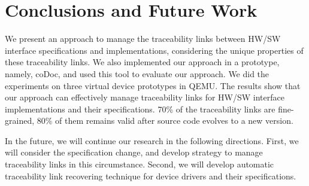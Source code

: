 \section{Conclusions and Future Work}
\label{sec:conclusion}
We present an approach to manage the traceability links between HW/SW interface specifications and implementations, considering the unique properties of these traceability links. We also implemented our approach in a prototype, namely, coDoc, and used this tool to evaluate our approach. We did the experiments on three virtual device prototypes in QEMU. The results show that our approach can effectively manage traceability links for HW/SW interface implementations and their specifications. 70\% of the traceability links are fine-grained, 80\% of them remains valid after source code evolves to a new version.

In the future, we will continue our research in the following directions. First, we will consider the specification change, and develop strategy to manage traceability links in this circumstance. Second, we will develop automatic traceability link recovering technique for device drivers and their specifications.
